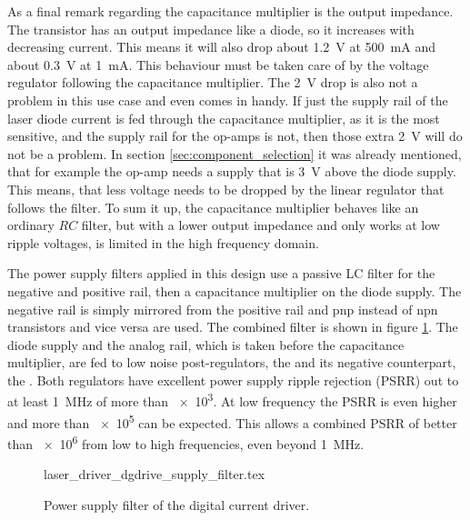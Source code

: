 As a final remark regarding the capacitance multiplier is the output impedance. The transistor has an output impedance like a diode, so it increases with decreasing current. This means it will also drop about \qty{1.2}{\V} at \qty{500}{\mA} and about \qty{0.3}{\V} at \qty{1}{\mA}. This behaviour must be taken care of by the voltage regulator following the capacitance multiplier. The \qty{2}{\V} drop is also not a problem in this use case and even comes in handy. If just the supply rail of the laser diode current is fed through the capacitance multiplier, as it is the most sensitive, and the supply rail for the op-amps is not, then those extra \qty{2}{\V} will do not be a problem. In section \ref{sec:component_selection} it was already mentioned, that for example the  op-amp needs a supply that is \qty{3}{\V} above the diode supply. This means, that less voltage needs to be dropped by the linear regulator that follows the filter. To sum it up, the capacitance multiplier behaves like an ordinary $RC$ filter, but with a lower output impedance and only works at low ripple voltages, is limited in the high frequency domain.

The power supply filters applied in this design use a passive LC filter for the negative and positive rail, then a capacitance multiplier on the diode supply. The negative rail is simply mirrored from the positive rail and pnp instead of npn transistors and vice versa are used. The combined filter is shown in figure \ref{fig:laser_driver_dgdrive_filter}. The diode supply and the analog rail, which is taken before the capacitance multiplier, are fed to low noise post-regulators, the  and its negative counterpart, the . Both regulators have excellent power supply ripple rejection (PSRR) out to at least \qty{1}{\MHz} of more than \num{e3}. At low frequency the PSRR is even higher and more than \num{e5} can be expected. This allows a combined PSRR of better than \num{e6} from low to high frequencies, even beyond \qty{1}{\MHz}.

\begin{figure}[ht]
    \centering
        {laser_driver_dgdrive_supply_filter.tex}
    \caption{Power supply filter of the digital current driver.}
    \label{fig:laser_driver_dgdrive_filter}
\end{figure}

